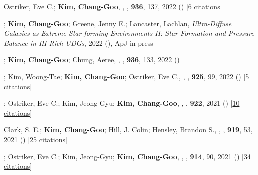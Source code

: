 \item[{16.}]Ostriker, Eve C.; \textbf{Kim, Chang-Goo}, , \apj, \textbf{936}, 137, 2022 () [\href{http://adsabs.harvard.edu/abs/2022ApJ...936..137O}{6 citations}]

\item[{17.}]; \textbf{Kim, Chang-Goo}; Greene, Jenny E.; Lancaster, Lachlan, \textit{Ultra-Diffuse Galaxies as Extreme Star-forming Environments II: Star Formation and Pressure Balance in HI-Rich UDGs}, 2022 (), ApJ in press

\item[{18.}]; \textbf{Kim, Chang-Goo}; Chung, Aeree, , \apj, \textbf{936}, 133, 2022 ()

\item[{19.}]; Kim, Woong-Tae; \textbf{Kim, Chang-Goo}; Ostriker, Eve C., , \apj, \textbf{925}, 99, 2022 () [\href{http://adsabs.harvard.edu/abs/2022ApJ...925...99M}{5 citations}]

\item[{20.}]; Ostriker, Eve C.; Kim, Jeong-Gyu; \textbf{Kim, Chang-Goo}, , \apj, \textbf{922}, 2021 () [\href{http://adsabs.harvard.edu/abs/2021ApJ...922L...3L}{10 citations}]

\item[{21.}]Clark, S. E.; \textbf{Kim, Chang-Goo}; Hill, J. Colin; Hensley, Brandon S., , \apj, \textbf{919}, 53, 2021 () [\href{http://adsabs.harvard.edu/abs/2021ApJ...919...53C}{25 citations}]

\item[{22.}]; Ostriker, Eve C.; Kim, Jeong-Gyu; \textbf{Kim, Chang-Goo}, , \apj, \textbf{914}, 90, 2021 () [\href{http://adsabs.harvard.edu/abs/2021ApJ...914...90L}{34 citations}]

